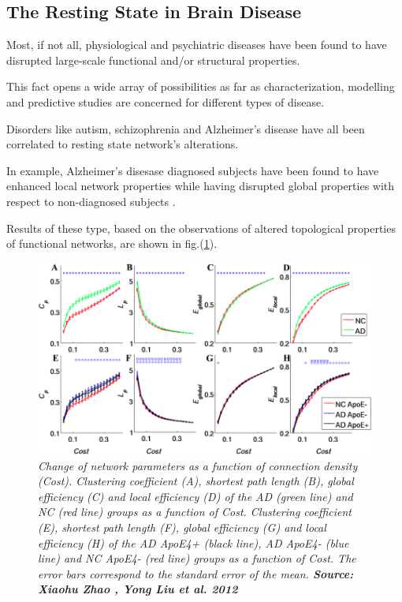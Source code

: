\documentclass[12pt,openright,twoside,a4paper]{book}
\begin{document}
\clearpage

\subsection{The Resting State in Brain Disease}

Most, if not all, physiological and psychiatric diseases have been found to have disrupted large-scale functional and/or structural properties.

This fact opens a wide array of possibilities as far as characterization, modelling and predictive studies are concerned for different types of disease.

Disorders like autism, schizophrenia and Alzheimer's disease have all been correlated to resting state network's alterations.
\vspace{5mm}

In example, Alzheimer's disesase diagnosed subjects have been found to have enhanced local network properties while having disrupted global properties with respect to non-diagnosed subjects \cite{ssa}.

Results of these type, based on the observations of altered topological properties of functional networks, are shown in fig.(\ref{ssa}).

\begin{figure}[!h]
\centering
\includegraphics[scale=0.45]{ssa}
\caption{\textit{Change of network parameters as a function of connection density (Cost). Clustering coefficient (A), shortest path length (B), global efficiency (C) and local efficiency (D) of the AD (green line) and NC (red line) groups as a function of Cost. Clustering coefficient (E), shortest path length (F), global efficiency (G) and local efficiency (H) of the AD ApoE4+ (black line), AD ApoE4- (blue line) and NC ApoE4- (red line) groups as a function of Cost. The error bars correspond to the standard error of the mean. \textbf{Source: Xiaohu Zhao , Yong Liu et al. 2012 \cite{ssa}}}}
\label{ssa}
\end{figure}
\end{document}

